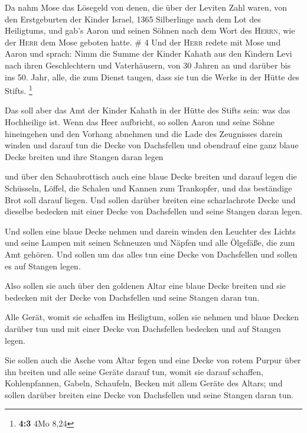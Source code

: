  Da nahm Mose das Lösegeld von denen, die über der
Leviten Zahl waren,  von den Erstgeburten der Kinder
Israel, 1365 Silberlinge nach dem Lot des Heiligtums, 
und gab's Aaron und seinen Söhnen nach dem Wort des \textsc{Herrn}, wie
der \textsc{Herr} dem Mose geboten hatte. \# 4  Und der
\textsc{Herr} redete mit Mose und Aaron und sprach:  Nimm
die Summe der Kinder Kahath aus den Kindern Levi nach ihren
Geschlechtern und Vaterhäusern,  von 30 Jahren an und
darüber bis ins 50. Jahr, alle, die zum Dienst taugen, dass sie tun die
Werke in der Hütte des Stifts. \footnote{\textbf{4:3} 4Mo 8,24}

 Das soll aber das Amt der Kinder Kahath in der Hütte des
Stifts sein: was das Hochheilige ist.  Wenn das Heer
aufbricht, so sollen Aaron und seine Söhne hineingehen und den Vorhang
abnehmen und die Lade des Zeugnisses darein winden  und
darauf tun die Decke von Dachsfellen und obendrauf eine ganz blaue Decke
breiten und ihre Stangen daran legen

 und über den Schaubrottisch auch eine blaue Decke breiten
und darauf legen die Schüsseln, Löffel, die Schalen und Kannen zum
Trankopfer, und das beständige Brot soll darauf liegen. 
Und sollen darüber breiten eine scharlachrote Decke und dieselbe
bedecken mit einer Decke von Dachsfellen und seine Stangen daran legen.

 Und sollen eine blaue Decke nehmen und darein winden den
Leuchter des Lichts und seine Lampen mit seinen Schneuzen und Näpfen und
alle Ölgefäße, die zum Amt gehören.  Und sollen um das
alles tun eine Decke von Dachsfellen und sollen es auf Stangen legen.

 Also sollen sie auch über den goldenen Altar eine blaue
Decke breiten und sie bedecken mit der Decke von Dachsfellen und seine
Stangen daran tun.

 Alle Gerät, womit sie schaffen im Heiligtum, sollen sie
nehmen und blaue Decken darüber tun und mit einer Decke von Dachsfellen
bedecken und auf Stangen legen.

 Sie sollen auch die Asche vom Altar fegen und eine Decke
von rotem Purpur über ihn breiten  und alle seine Geräte
darauf tun, womit sie darauf schaffen, Kohlenpfannen, Gabeln, Schaufeln,
Becken mit allem Geräte des Altars; und sollen darüber breiten eine
Decke von Dachsfellen und seine Stangen daran tun.

